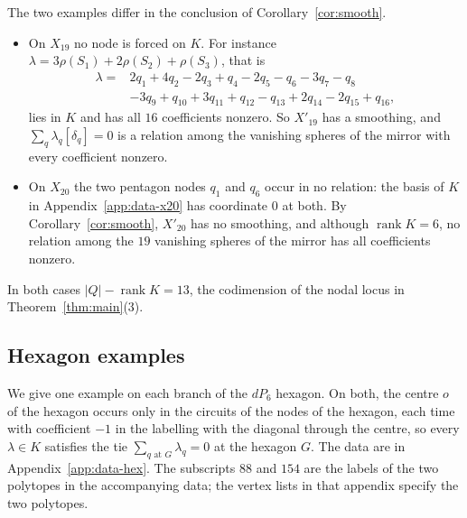 The two examples differ in the conclusion of Corollary~\ref{cor:smooth}.
\begin{itemize}
\item On $X_{19}$ no node is forced on $K$. For instance
$\lambda=3\rho(S_1)+2\rho(S_2)+\rho(S_3)$, that is
\[
\begin{aligned}
\lambda={}&2q_1+4q_2-2q_3+q_4-2q_5-q_6-3q_7-q_8\\
&-3q_9+q_{10}+3q_{11}+q_{12}-q_{13}+2q_{14}-2q_{15}+q_{16},
\end{aligned}
\]
lies in $K$ and has all $16$ coefficients nonzero. So $X'_{19}$ has a smoothing, and $\sum_q\lambda_q[\delta_q]=0$ is a
relation among the vanishing spheres of the mirror with every coefficient nonzero.
\item On $X_{20}$ the two pentagon nodes $q_1$ and $q_6$ occur in no relation: the basis of $K$ in
Appendix~\ref{app:data-x20} has coordinate $0$ at both. By Corollary~\ref{cor:smooth}, $X'_{20}$ has no smoothing, and
although $\operatorname{rank}K=6$, no relation among the $19$ vanishing spheres of the mirror has all coefficients
nonzero.
\end{itemize}
In both cases $|Q|-\operatorname{rank}K=13$, the codimension of the nodal locus in Theorem~\ref{thm:main}(3).

\subsection{Hexagon examples}\label{ssec:hexexamples}
We give one example on each branch of the $dP_6$ hexagon. On both, the centre $o$ of the hexagon occurs only in the
circuits of the nodes of the hexagon, each time with coefficient $-1$ in the labelling with the diagonal through the
centre, so every $\lambda\in K$ satisfies the tie $\sum_{q\text{ at }G}\lambda_q=0$ at the hexagon $G$. The data are in
Appendix~\ref{app:data-hex}. The subscripts $88$ and $154$ are the labels of the two polytopes in the accompanying data;
the vertex lists in that appendix specify the two polytopes.


